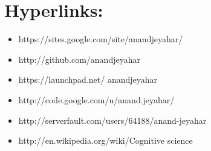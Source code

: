 
\section {Hyperlinks:}
	\begin {itemize}

		\item https://sites.google.com/site/anandjeyahar/

		\item http://github.com/anandjeyahar

		\item https://launchpad.net/ anandjeyahar

		\item http://code.google.com/u/anand.jeyahar/

		\item http://serverfault.com/users/64188/anand-jeyahar

		\item http://en.wikipedia.org/wiki/Cognitive science




	\end{itemize}

